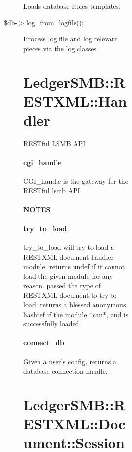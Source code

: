 \begin{description}
\begin{description}
\begin{description}
\begin{description}
\begin{description}
\begin{description}
\begin{description}
Loads database Roles templates.


\item[{\$db-$>$log\_from\_logfile();}] \mbox{}

Process log file and log relevant pieces via the log classes.

\section{LedgerSMB::RESTXML::Handler\label{LedgerSMB::RESTXML::Handler}}


RESTful LSMB API

\paragraph*{cgi\_handle\label{LedgerSMB::RESTXML::Handler_cgi_handle}}


CGI\_handle is the gateway for the RESTful lsmb API.

\paragraph*{NOTES\label{LedgerSMB::RESTXML::Handler_NOTES}}
\paragraph*{try\_to\_load\label{LedgerSMB::RESTXML::Handler_try_to_load}}


try\_to\_load will try to load a RESTXML document handler module.  returns undef
if it cannot load the given module for any reason.  passed the type of RESTXML
document to try to load.  returns a blessed anonymous hashref if the module
*can*, and is successfully loaded.

\paragraph*{connect\_db\label{LedgerSMB::RESTXML::Handler_connect_db}}


Given  a user's config, returns a database connection handle.

\section{LedgerSMB::RESTXML::Document::Session\label{LedgerSMB::RESTXML::Document::Session}}



\end{description}
\end{description}
\end{description}
\end{description}
\end{description}
\end{description}
\end{description}
